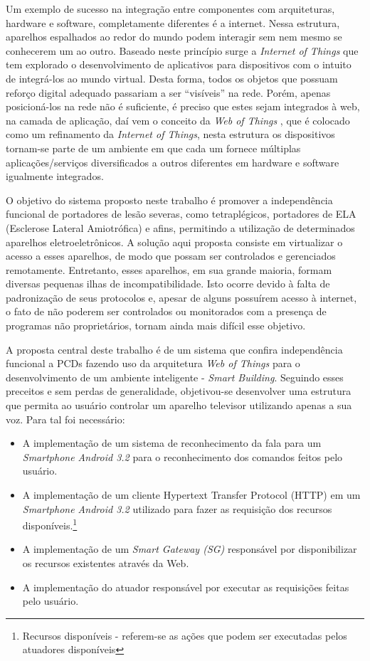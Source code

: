 \documentclass[12pt,a4paper,oneside]{report}
\begin{document}
Um exemplo de sucesso na integração entre componentes com arquiteturas, hardware e software, completamente diferentes é a internet. Nessa estrutura, aparelhos espalhados ao redor do mundo podem interagir sem nem mesmo se conhecerem um ao outro. Baseado neste princípio surge a \emph{Internet of Things}\cite{IoT} que tem explorado o desenvolvimento de aplicativos para dispositivos com o intuito de integrá-los ao mundo virtual. Desta forma, todos os objetos que possuam reforço digital adequado passariam a ser ``visíveis'' na rede. Porém, apenas posicioná-los na rede não é suficiente, é preciso que estes sejam integrados à web, na camada de aplicação, daí vem o conceito da \emph{Web of Things} \cite{wotdovad}, que é colocado como um refinamento da \emph{Internet of Things}, nesta estrutura os dispositivos tornam-se parte de um ambiente em que cada um fornece múltiplas aplicações/serviços diversificados a outros diferentes em hardware e software igualmente integrados.

O objetivo do sistema proposto neste trabalho é promover a independência funcional de portadores de lesão severas, como tetraplégicos, portadores de ELA (Esclerose Lateral Amiotrófica) e afins, permitindo a utilização de determinados aparelhos eletroeletrônicos. A solução aqui proposta consiste em virtualizar o acesso a esses aparelhos, de modo que possam ser controlados e gerenciados remotamente. Entretanto, esses aparelhos, em sua grande maioria, formam diversas pequenas ilhas de incompatibilidade. Isto ocorre devido à falta de padronização de seus protocolos e, apesar de alguns possuírem acesso à internet, o fato de não poderem ser controlados ou monitorados com a presença de programas não proprietários, tornam ainda mais difícil esse objetivo.

A proposta central deste trabalho é  de um sistema que confira independência funcional a PCDs fazendo uso da arquitetura \emph{Web of Things} para o desenvolvimento de um ambiente inteligente - \emph{Smart Building}. Seguindo esses preceitos e sem perdas de generalidade, objetivou-se desenvolver uma estrutura que permita ao usuário controlar um aparelho televisor utilizando apenas a sua voz. Para tal foi necessário:
\begin{itemize}
\item A implementação de um sistema de reconhecimento da fala para um \emph{Smartphone Android 3.2} para o reconhecimento dos comandos feitos pelo usuário.
\item A implementação de um cliente Hypertext Transfer Protocol (HTTP) em um \emph{Smartphone Android 3.2} utilizado para fazer as requisição dos recursos disponíveis.\footnote{Recursos disponíveis - referem-se as ações que podem ser executadas pelos atuadores disponíveis}
\item A implementação de um \emph{Smart Gateway (SG)} responsável por disponibilizar os recursos existentes através da Web.
\item A implementação do atuador responsável por executar as requisições feitas pelo usuário.
\end{itemize}
\end{document}

